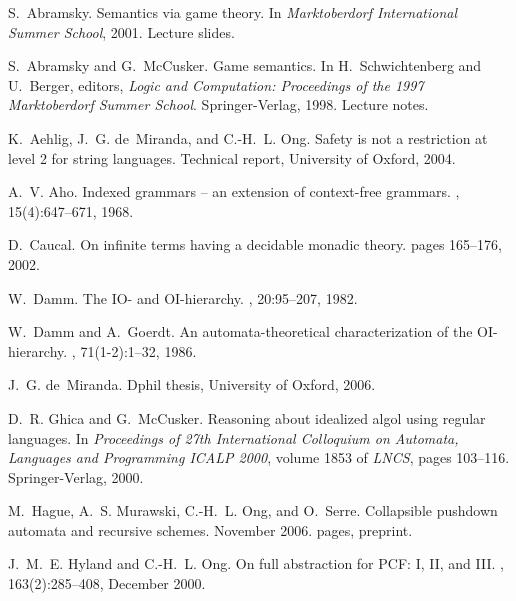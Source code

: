 \documentclass{llncs}
\begin{document}
\begin{thebibliography}{10}

S.~Abramsky.
\newblock Semantics via game theory.
\newblock In {\em Marktoberdorf International Summer School}, 2001.
\newblock Lecture slides.

S.~Abramsky and G.~McCusker.
\newblock Game semantics.
\newblock In H.~Schwichtenberg and U.~Berger, editors, {\em Logic and
  Computation: Proceedings of the 1997 Marktoberdorf Summer School}.
  Springer-Verlag, 1998.
\newblock Lecture notes.

K.~Aehlig, J.~G. de~Miranda, and C.-H.~L. Ong.
\newblock Safety is not a restriction at level 2 for string languages.
\newblock Technical report, University of Oxford, 2004.

A.~V. Aho.
\newblock Indexed grammars -- an extension of context-free grammars.
, 15(4):647--671, 1968.

D.~Caucal.
\newblock On infinite terms having a decidable monadic theory.
\newblock pages 165--176, 2002.

W.~Damm.
\newblock The {IO-} and {OI}-hierarchy.
, 20:95--207, 1982.

W.~Damm and A.~Goerdt.
\newblock An automata-theoretical characterization of the {OI}-hierarchy.
, 71(1-2):1--32, 1986.

J.~G. de~Miranda.
\newblock Dphil thesis, University of Oxford, 2006.

D.~R. Ghica and G.~McCusker.
\newblock Reasoning about idealized {\sc algol} using regular languages.
\newblock In {\em Proceedings of 27th International Colloquium on Automata,
  Languages and Programming ICALP 2000}, volume 1853 of {\em LNCS}, pages
  103--116. Springer-Verlag, 2000.

M.~Hague, A.~S. Murawski, C.-H.~L. Ong, and O.~Serre.
\newblock Collapsible pushdown automata and recursive schemes.
\newblock November 2006.
 pages, preprint.

J.~M.~E. Hyland and C.-H.~L. Ong.
\newblock On full abstraction for {PCF}: {I, II, and III}.
, 163(2):285--408, December 2000.


\end{thebibliography}
\end{document}
